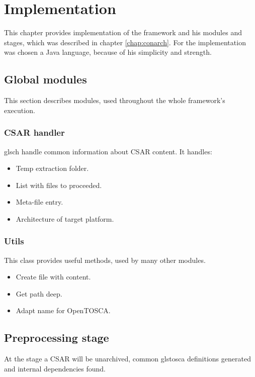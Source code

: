 
\chapter{Implementation}\label{chap:imp}
This chapter provides implementation of the framework and his modules and stages, which was described in chapter \ref{chap:conarch}.
For the implementation was chosen a Java language, because of his simplicity and strength. 

\section{Global modules}
This section describes modules, used throughout the whole framework's execution.

\subsection{CSAR handler}
gls{ch} handle common information about CSAR content.
It handles:
\begin{itemize}
	\item Temp extraction folder.
	\item List with files to proceeded.
	\item Meta-file entry.
	\item Architecture of target platform.
\end{itemize}

\subsection{Utils}
This class provides useful methods, used by many other modules.
\begin{itemize}
	\item Create file with content.
	\item Get path deep.
	\item Adapt name for OpenTOSCA.
\end{itemize}

\section{Preprocessing stage}
At the  stage a CSAR will be unarchived, common gls{tosca} definitions generated and internal dependencies found. 

